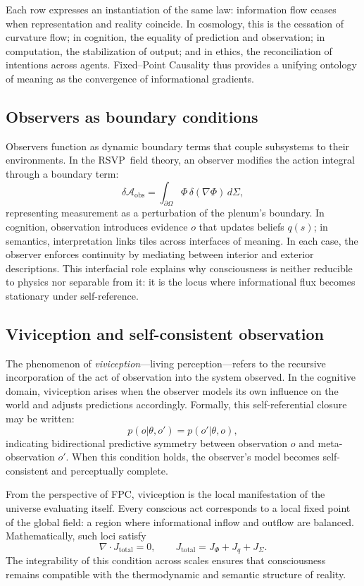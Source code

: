 \documentclass[12pt,a4paper]{article}
\newcommand{\RSVP}{RSVP}              %
\theoremstyle{plain}
\begin{document}
Each row expresses an instantiation of the same law:
information flow ceases when representation and reality coincide.
In cosmology, this is the cessation of curvature flow;
in cognition, the equality of prediction and observation;
in computation, the stabilization of output;
and in ethics, the reconciliation of intentions across agents.
Fixed--Point Causality thus provides a unifying ontology of meaning as the convergence of informational gradients.

\subsection{Observers as boundary conditions}
Observers function as dynamic boundary terms that couple subsystems to their environments.
In the \RSVP\ field theory, an observer modifies the action integral through a boundary term:
\[
\delta \mathcal{A}_\text{obs}
 = \int_{\partial \Omega} \Phi\, \delta (\nabla \Phi)\, d\Sigma,
\]
representing measurement as a perturbation of the plenum’s boundary.
In cognition, observation introduces evidence \(o\) that updates beliefs \(q(s)\);
in semantics, interpretation links tiles across interfaces of meaning.
In each case, the observer enforces continuity by mediating between interior and exterior descriptions.
This interfacial role explains why consciousness is neither reducible to physics nor separable from it: it is the locus where informational flux becomes stationary under self-reference.

\subsection{Viviception and self-consistent observation}
The phenomenon of \emph{viviception}---living perception---refers to the recursive incorporation of the act of observation into the system observed.
In the cognitive domain, viviception arises when the observer models its own influence on the world and adjusts predictions accordingly.
Formally, this self-referential closure may be written:
\[
p(o|\theta,o') = p(o'|\theta,o),
\]
indicating bidirectional predictive symmetry between observation \(o\) and meta-observation \(o'\).
When this condition holds, the observer’s model becomes self-consistent and perceptually complete.

From the perspective of FPC, viviception is the local manifestation of the universe evaluating itself.
Every conscious act corresponds to a local fixed point of the global field: 
a region where informational inflow and outflow are balanced.
Mathematically, such loci satisfy
\[
\nabla\cdot J_\text{total} = 0, \qquad J_\text{total}=J_\Phi+J_q+J_\Sigma.
\]
The integrability of this condition across scales ensures that consciousness remains compatible with the thermodynamic and semantic structure of reality.
\end{document}
